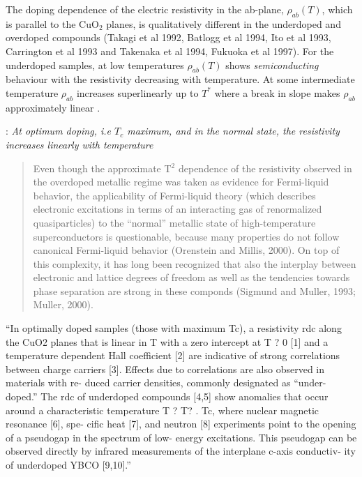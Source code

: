 The doping dependence of the electric resistivity in the ab-plane, $\rho_{ab}(T)$, which is parallel to the CuO$_2$ planes, is qualitatively different in the underdoped and overdoped compounds \cite{?}(Takagi et al 1992, Batlogg et al 1994, Ito et al
1993, Carrington et al 1993 and Takenaka et al 1994, Fukuoka et al 1997).
For the underdoped samples, at low temperatures $\rho_{ab}(T)$ shows \textit{semiconducting} behaviour with the resistivity decreasing with temperature.
At some intermediate temperature $\rho_{ab}$ increases superlinearly up to $T^*$ where a break in slope makes $\rho_{ab}$ approximately linear \cite{Timusk1999}.

\cite{Muller2007}: \textit{At optimum doping, i.e $T_c$ maximum, and in the normal state, the resistivity increases linearly with temperature}

\cite{Damascelli2003}
\begin{quote}
Even though the approximate T$^2$ dependence of the resistivity observed in the overdoped metallic regime was taken as evidence for Fermi-liquid behavior, the applicability of Fermi-liquid theory (which describes electronic excitations in terms of an interacting gas of renormalized quasiparticles) to the ``normal'' metallic state of high-temperature superconductors is questionable, because many properties do not follow canonical Fermi-liquid behavior (Orenstein and Millis, 2000).
On top of this complexity, it has long been recognized that also the interplay between electronic and lattice degrees of freedom as well as the tendencies towards phase separation are strong in these componds (Sigmund and Muller, 1993; Muller, 2000). 
\end{quote}

``In optimally doped samples (those with maximum Tc), a resistivity rdc along the CuO2 planes that is linear in T with a zero intercept at T ? 0 [1] and a temperature dependent Hall coefficient [2] are indicative of strong correlations between charge carriers [3]. Effects due to correlations are also observed in materials with re- duced carrier densities, commonly designated as “under- doped.” The rdc of underdoped compounds [4,5] show anomalies that occur around a characteristic temperature T ? T? . Tc, where nuclear magnetic resonance [6], spe- cific heat [7], and neutron [8] experiments point to the opening of a pseudogap in the spectrum of low- energy excitations. This pseudogap can be observed directly by infrared measurements of the interplane c-axis conductiv- ity of underdoped YBCO [9,10].'' \cite{Basov1996}

